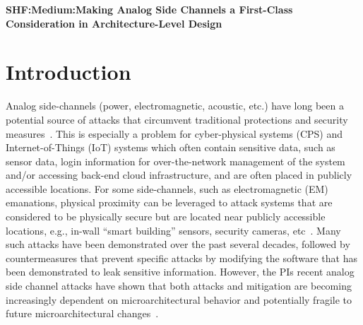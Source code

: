 \documentclass[11 pt]{article}
\begin{document}

\begin{center}
{\Large \textbf{SHF:Medium:Making Analog Side Channels a First-Class Consideration in Architecture-Level Design}}
\end{center}

\section{Introduction}
Analog side-channels (power, electromagnetic, acoustic, etc.) have long been a potential source of attacks that circumvent traditional protections and security measures~\cite{217605,Backes:2010:ASA:1929820.1929847,Balasch2015DPABA,10.1007/978-3-319-66787-4_27,4812164,Chari:2002:TA:648255.752740,Genkin:2016:EKE:2976749.2978353}. This is especially a problem for cyber-physical systems (CPS) and Internet-of-Things (IoT) systems which often contain sensitive data, such as sensor data, login information for over-the-network management of the system and/or accessing back-end cloud infrastructure, and are often placed in publicly accessible  locations. For some side-channels, such as electromagnetic (EM) emanations, physical proximity can be leveraged to attack systems that are considered to be physically secure but are located near publicly accessible locations, e.g., in-wall ``smart building'' sensors, security cameras, etc~\cite{10.1007/978-3-662-48324-4_11,6766222,Camurati:2018:SCE:3243734.3243802,8574570}.
Many such attacks have been demonstrated over the past several decades, followed by countermeasures that prevent specific attacks by modifying the software that has been demonstrated to leak sensitive information. However, the PIs recent analog side channel attacks have shown that both attacks and mitigation are becoming increasingly dependent on microarchitectural behavior and potentially fragile to future microarchitectural changes~\cite{217605,Monjur21}.
\end{document}
